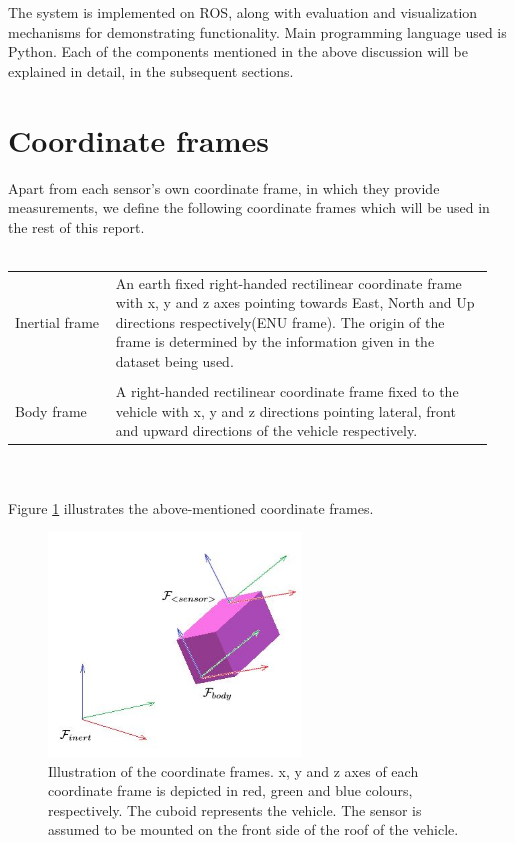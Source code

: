 The system is implemented on \gls{ROS}, along with evaluation and visualization mechanisms for demonstrating functionality. Main programming language used is Python. Each of the components mentioned in the above discussion will be explained in detail, in the subsequent sections.







\section{Coordinate frames}
Apart from each sensor's own coordinate frame, in which they provide measurements, we define the following coordinate frames which will be used in the rest of this report.\\\\
\begin{tabular}{p{0.2\linewidth} p{0.75\linewidth} } 
	Inertial frame & An earth fixed right-handed rectilinear coordinate frame with x, y and z axes pointing towards East, North and Up directions respectively(ENU frame). The origin of the frame is determined by the information given in the dataset being used.\\\\
	Body frame & A right-handed rectilinear coordinate frame fixed to the vehicle with x, y and z directions pointing lateral, front and upward directions of the vehicle respectively.
\end{tabular}\\\\
Figure \ref{fig:pa:coordinateFrames} illustrates the above-mentioned coordinate frames.
\begin{figure}[h]
	\begin{center}
	\includegraphics[width=0.6\textwidth]{figs/coordinate-frames.jpg}
	\end{center}
	\vspace{-0.5cm}
	\caption[Coordinate frames]{Illustration of the coordinate frames. x, y and z axes of each coordinate frame is depicted in red, green and blue colours, respectively. The cuboid represents the vehicle. The sensor is assumed to be mounted on the front side of the roof of the vehicle.}
	\label{fig:pa:coordinateFrames}
	\vspace{0.5cm}
\end{figure}






